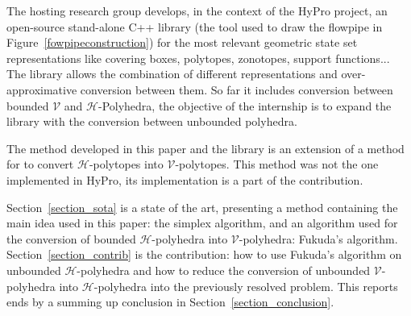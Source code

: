 The hosting research group develops, in the context of the HyPro project, an open-source stand-alone C++ library (the tool used to draw the flowpipe in Figure~\ref{fowpipeconstruction}) for the most relevant geometric state set representations like covering boxes, polytopes, zonotopes, support functions... 
The library allows the combination of different representations and over-approximative conversion between them. So far it includes conversion between bounded $\mathcal{V}$ and $\mathcal{H}$-Polyhedra, the objective of the internship is to expand the library with the conversion between unbounded polyhedra.

The method developed in this paper and the library is an extension of a method for to convert $\mathcal{H}$-polytopes into $\mathcal{V}$-polytopes. This method was not the one implemented in HyPro, its implementation is a part of the contribution.

Section~\ref{section_sota} is a state of the art, presenting a method containing the main idea used in this paper: the simplex algorithm, and an algorithm used for the conversion of bounded $\mathcal{H}$-polyhedra into $\mathcal{V}$-polyhedra: Fukuda's algorithm. Section~\ref{section_contrib} is the contribution: how to use Fukuda's algorithm on unbounded $\mathcal{H}$-polyhedra and how to reduce the conversion of unbounded $\mathcal{V}$-polyhedra into $\mathcal{H}$-polyhedra into the previously resolved problem. This reports ends by a summing up conclusion in Section~\ref{section_conclusion}. 



